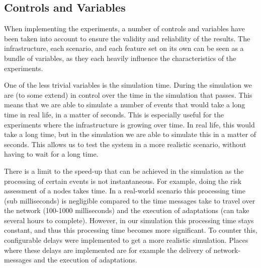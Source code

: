 \subsection{Controls and Variables}
\label{ssec:controls-variables}

When implementing the experiments, a number of controls and variables have been taken into account to ensure the validity and reliability of the results. The infrastructure, each scenario, and each feature set on its own can be seen as a bundle of variables, as they each heavily influence the characteristics of the experiments. 


\label{sssec:simulation-time}
One of the less trivial variables is the simulation time. During the simulation we are (to some extend) in control over the time in the simulation that passes. This means that we are able to simulate a number of events that would take a long time in real life, in a matter of seconds. This is especially useful for the experiments where the infrastructure is growing over time. In real life, this would take a long time, but in the simulation we are able to simulate this in a matter of seconds. This allows us to test the system in a more realistic scenario, without having to wait for a long time.

There is a limit to the speed-up that can be achieved in the simulation as the processing of certain events is not instantaneous. For example, doing the risk assessment of a nodes takes time. In a real-world scenario this processing time (sub milliseconds) is negligible compared to the time messages take to travel over the network (100-1000 milliseconds) and the execution of adaptations (can take several hours to complete). However, in our simulation this processing time stays constant, and thus this processing time becomes more significant. To counter this, configurable delays were implemented to get a more realistic simulation. 
Places where these delays are implemented are for example the delivery of network-messages and the execution of adaptations. 

